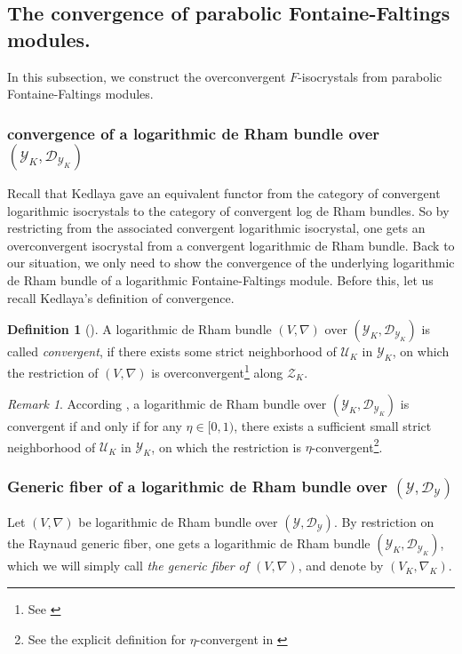 \documentclass[12pt,twoside]{book}
\theoremstyle{plain}
\theoremstyle{definition}
\newtheorem{definition}[definition]{Definition}
\theoremstyle{remark}
\newtheorem{remark}[remark]{Remark}
\newcommand{\mD}{{\mathcal D}}
\newcommand{\mU}{{\mathcal U}}
\newcommand{\mY}{{\mathcal Y}}
\newcommand{\mZ}{{\mathcal Z}}
\numberwithin{equation}{section}
\begin{document}
\subsection{The convergence of parabolic Fontaine-Faltings modules.}

In this subsection, we construct the overconvergent $F$-isocrystals from parabolic Fontaine-Faltings modules.

\subsubsection{convergence of a logarithmic de Rham bundle over $(\mY_K,\mD_{\mY_K})$}
Recall that Kedlaya gave an equivalent functor \cite[6.4.1]{Ked07} from the category of convergent
logarithmic isocrystals\cite[6.1.7]{Ked07} to the category of convergent log de Rham bundles\cite[6.3.1]{Ked07}. So by restricting from the associated convergent logarithmic isocrystal, one gets an overconvergent isocrystal from a convergent logarithmic de Rham bundle. Back to our situation, we only need to show the convergence of the underlying logarithmic de Rham bundle of a logarithmic Fontaine-Faltings module. Before this, let us recall Kedlaya's definition of convergence.
\begin{definition}[{\cite[6.3.1]{Ked07}}]
A logarithmic de Rham bundle $(V,\nabla)$ over $(\mY_K,\mD_{\mY_K})$ is called \emph{convergent}, if there exists some strict neighborhood of $\mU_K$ in $\mY_K$, on which the restriction of $(V,\nabla)$ is overconvergent\footnote{See \cite[2.5.3 and 2.5.4]{Ked07}} along $\mZ_K$.
\end{definition}

\begin{remark}
According \cite[Proposition 2.5.6]{Ked07}, a logarithmic de Rham bundle over $(\mY_K,\mD_{\mY_K})$ is convergent if and only if for any $\eta\in[0,1)$, there exists a sufficient small strict neighborhood of $\mU_K$ in $\mY_K$, on which the restriction is $\eta$-convergent\footnote{See the explicit definition for $\eta$-convergent in \cite[Definition 2.4.2]{Ked07}}.
\end{remark}

\subsubsection{Generic fiber of a logarithmic de Rham bundle over $(\mY,\mD_\mY)$}

Let $(V,\nabla)$ be logarithmic de Rham bundle over $(\mY,\mD_\mY)$. By restriction on the Raynaud generic fiber, one gets a logarithmic de Rham bundle $(\mY_K,\mD_{\mY_K})$, which we will simply call \emph{the generic fiber of $(V,\nabla)$}, and denote by $(V_K,\nabla_K)$.
\end{document}
